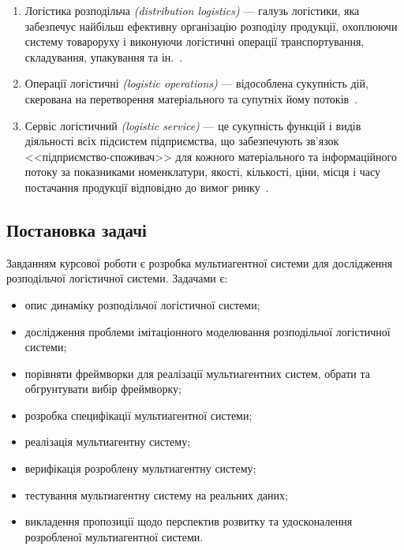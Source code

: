 \begin{enumerate}
	\item Логістика розподільча \textit{(distribution logistics)} --- галузь логістики, яка забезпечує найбільш ефективну організацію розподілу продукції, охоплюючи систему товароруху і виконуючи логістичні операції транспортування, складування, упакування та ін.~\cite{Kusluy2010}.
    \item Операції логістичні \textit{(logistic operations)} --- відособлена сукупність дій, скерована на перетворення матеріального та супутніх йому потоків~\cite{Kusluy2010}.
    \item Сервіс логістичний \textit{(logistic service)} --- це сукупність функцій і видів діяльності всіх підсистем підприємства, що забезпечують зв’язок <<підприємство-споживач>> для кожного матеріального та інформаційного потоку за показниками номенклатури, якості, кількості, ціни, місця і часу постачання продукції відповідно до вимог ринку~\cite{Kusluy2010}.
\end{enumerate}

\subsection{Постановка задачі}
Завданням курсової роботи є розробка мультиагентної системи для дослідження розподільчої логістичної системи.
Задачами є:
\begin{itemize}
	\item опис динаміку розподільчої логістичної системи;
	\item дослідження проблеми імітаціонного моделювання розподільчої логістичної системи;
	\item порівняти фреймворки для реалізації мультиагентних систем, обрати та обгрунтувати вибір фреймворку;
	\item розробка специфікації мультиагентної системи;
	\item реалізація мультиагентну систему;
	\item верифікація розроблену мультиагентну систему;
	\item тестування мультиагентну систему на реальних даних;
	\item викладення пропозиції щодо перспектив розвитку та удосконалення розробленої мультиагентної системи.
\end{itemize}
